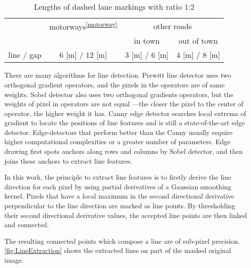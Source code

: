 \setlength{\floatsep}{16pt plus 1.0pt minus 2.0pt}
\begin{table} [h!]
	\centering
	\begin{tabular}{l|ccc}
		\toprule
		& motorways\textsuperscript{\ref{motorway}} & \multicolumn{2}{c}{other roads}\\
		\cline{3-4}
		&           & in town & out of town\\
		\midrule
		line / gap  & $6$ [m] / $12$ [m] & $3$ [m] / $6$ [m] & $4$ [m] / $8$ [m]\\
		\bottomrule
	\end{tabular}
	\caption{\small Lengths of dashed lane markings with ratio 1:2 \cite{RMS1}}
	\label{tab:DashedLaneMarkingLengths}
\end{table}


\clearpage

There are many algorithms for line detection. %
Prewitt line detector uses two orthogonal gradient operators, and the pixels in the operators are of same weights. Sobel detector also uses two orthogonal gradients operators, but the weights of pixel in operators are not equal ---the closer the pixel to the center of operator, the higher weight it has. Canny edge detector searches local extrema of gradient to locate the positions of line features and is still a state-of-the-art edge detector. Edge-detectors that perform better than the Canny usually require higher computational complexities or a greater number of parameters. Edge drawing \cite{Topal2012} first spots anchors along rows and columns by Sobel detector, and then joins these anchors to extract line features.

In this work, the principle to extract line features is to firstly derive the line direction for each pixel by using partial derivatives of a Gaussian smoothing kernel. Pixels that have a local maximum in the second directional derivative perpendicular to the line direction are marked as line points. By thresholding their second directional derivative values, the accepted line points are then linked and connected.\cite{Steger1998}

The resulting connected points which compose a line are of sub-pixel precision. \cref{fig:LineExtraction} shows the extracted lines on part of the masked original image.

